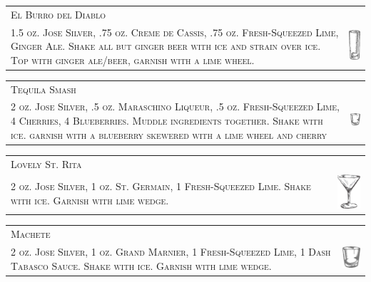\documentclass{article}
\begin{document}
\begin{tabular}{b{2.5in} m{0.625in}}
  \multicolumn{2}{p{3.5in}}{\centering\Huge\textsc{El Burro del Diablo}} \\ 
  
  \textsc{1.5 oz. Jose Silver, .75 oz. Creme de Cassis, .75
    oz. Fresh-Squeezed Lime, Ginger Ale. Shake all but ginger beer
    with ice and strain over ice. Top with ginger ale/beer, garnish
    with a lime wheel.} & \includegraphics[width=0.5in]{collins.png}
\end{tabular}

\begin{tabular}{b{2.5in} m{0.625in}}
  \multicolumn{2}{p{3.5in}}{\centering\Huge\textsc{Tequila Smash}} \\ 
  
  \textsc{2 oz. Jose Silver, .5 oz. Maraschino Liqueur, .5
    oz. Fresh-Squeezed Lime, 4 Cherries, 4 Blueberries. Muddle
    ingredients together. Shake with ice.  garnish with a blueberry
    skewered with a lime wheel and cherry} &
  \includegraphics[width=0.5in]{rocks_glass.png}
\end{tabular}

\begin{tabular}{b{2.5in} m{0.625in}}
  \multicolumn{2}{p{3.5in}}{\centering\Huge\textsc{Lovely St. Rita}} \\ 
  
  \textsc{2 oz. Jose Silver, 1 oz. St. Germain, 1 Fresh-Squeezed
    Lime. Shake with ice.  Garnish with lime wedge.} &
  \includegraphics[width=0.5in]{goblet.png}
\end{tabular}

\begin{tabular}{b{2.5in} m{0.625in}}
  \multicolumn{2}{p{3.5in}}{\centering\Huge\textsc{Machete}} \\ 
  
  \textsc{2 oz. Jose Silver, 1 oz. Grand Marnier, 1 Fresh-Squeezed
    Lime, 1 Dash Tabasco Sauce. Shake with ice. Garnish with lime
    wedge.} & \includegraphics[width=0.5in]{rocks_glass.png}
\end{tabular}
\end{document}
